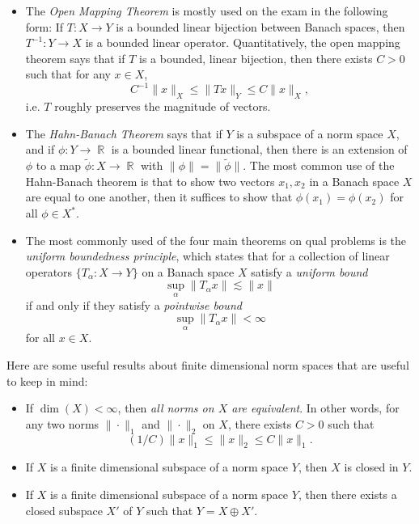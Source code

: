 \documentclass[answers]{exam}
\DeclareMathOperator{\RR}{\mathbb{R}}
\theoremstyle{problemstyle}
\newcommand{\1}[1]{\textbf{1}_{\left[#1\right]}} %
\begin{document}
\begin{questions}
\begin{itemize}
	\item The \emph{Open Mapping Theorem} is mostly used on the exam in the following form: If $T: X \to Y$ is a bounded linear bijection between Banach spaces, then $T^{-1}: Y \to X$ is a bounded linear operator. Quantitatively, the open mapping theorem says that if $T$ is a bounded, linear bijection, then there exists $C > 0$ such that for any $x \in X$,
	\[ C^{-1} \| x \|_X \leq \| Tx \|_Y \leq C \| x \|_X, \]
	i.e. $T$ roughly preserves the magnitude of vectors.

	\item The \emph{Hahn-Banach Theorem} says that if $Y$ is a subspace of a norm space $X$, and if $\phi: Y \to \RR$ is a bounded linear functional, then there is an extension of $\phi$ to a map $\tilde{\phi}: X \to \RR$ with $\| \phi \| = \| \tilde{\phi} \|$. The most common use of the Hahn-Banach theorem is that to show two vectors $x_1,x_2$ in a Banach space $X$ are equal to one another, then it suffices to show that $\phi(x_1) = \phi(x_2)$ for all $\phi \in X^*$.

	\item The most commonly used of the four main theorems on qual problems is the \emph{uniform boundedness principle}, which states that for a collection of linear operators $\{ T_\alpha: X \to Y \}$ on a Banach space $X$ satisfy a \emph{uniform bound}
	\[ \sup_\alpha \| T_\alpha x \| \lesssim \| x \| \]
	if and only if they satisfy a \emph{pointwise bound}
	\[ \sup_\alpha \| T_\alpha x \| < \infty \]
	for all $x \in X$.
\end{itemize}

Here are some useful results about finite dimensional norm spaces that are useful to keep in mind:
%
\begin{itemize}
	\item If $\dim(X) < \infty$, then \emph{all norms on $X$ are equivalent}. In other words, for any two norms $\| \cdot \|_1$ and $\| \cdot \|_2$ on $X$, there exists $C > 0$ such that
	\[ (1/C) \| x \|_1 \leq \| x \|_2 \leq C \| x \|_1. \]

	\item If $X$ is a finite dimensional subspace of a norm space $Y$, then $X$ is closed in $Y$.

	\item If $X$ is a finite dimensional subspace of a norm space $Y$, then there exists a closed subspace $X'$ of $Y$ such that $Y = X \oplus X'$.
\end{itemize}





\end{questions}
\end{document}

